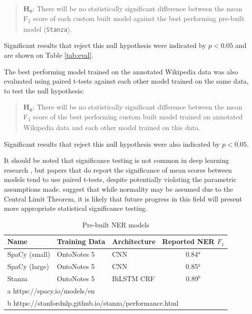 \documentclass[]{interact}
\theoremstyle{plain}%
\theoremstyle{definition}
\theoremstyle{remark}
\begin{document}
\begin{quote}
\(\mathbf{H_0}\): There will be no statistically significant difference
between the mean F\textsubscript{1} score of each custom built model
against the best performing pre-built model (\texttt{Stanza}).
\end{quote}

Significant results that reject this null hypothesis were indicated by
\(p<0.05\) and are shown on Table \ref{tab:eval}.

The best performing model trained on the annotated Wikipedia data was
also evaluated using paired t-tests against each other model trained on
the same data, to test the null hypothesis:

\begin{quote}
\(\mathbf{H_0}\): There will be no statistically significant difference
between the mean F\textsubscript{1} score of the best performing custom
built model trained on annotated Wikipedia data and each other model
trained on this data.
\end{quote}

Significant results that reject this null hypothesis were also indicated
by \(p<0.05\).

It should be noted that significance testing is not common in deep
learning research \citep{dror2018a}, but papers that do report the
significance of mean scores between models tend to use paired t-tests,
despite potentially violating the parametric assumptions made.
\citet{dror2018a} suggest that while normality may be assumed due to the
Central Limit Theorem, it is likely that future progress in this field
will present more appropriate statistical significance testing.

\begin{table}

\caption{\label{tab:prebuilt}Pre-built NER models}
\centering
\fontsize{9}{11}\selectfont
\begin{tabular}[t]{lllc}
\toprule
\textbf{Name} & \textbf{Training Data} & \textbf{Architecture} & \textbf{Reported NER $F_{1}$}\\
\midrule
SpaCy (small) & OntoNotes 5 & CNN & 0.84$^a$\\
SpaCy (large) & OntoNotes 5 & CNN & 0.85$^a$\\
Stanza & OntoNotes 5 & BiLSTM CRF & 0.89$^b$\\
\bottomrule
\multicolumn{4}{l}{\rule{0pt}{1em}a https://spacy.io/models/en}\\
\multicolumn{4}{l}{\rule{0pt}{1em}b https://stanfordnlp.github.io/stanza/performance.html}\\
\end{tabular}
\end{table}
\end{document}
